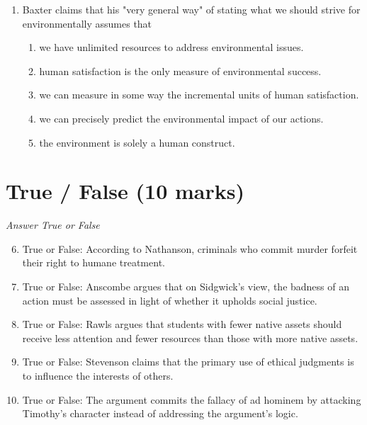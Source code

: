 \documentclass[12pt]{article}
\begin{document}
\begin{enumerate}[label=\arabic*.]
\begin{enumerate}[label=(\alph*)]
    \item Thomas Aquinas
    \item Catherine of Siena
    \item Teresa of Avila
    \item Hildegard of Bingen
    \item John of the Cross
\end{enumerate}
\item Baxter claims that his "very general way" of stating what we should strive for environmentally assumes that
\begin{enumerate}[label=(\alph*)]
    \item we have unlimited resources to address environmental issues.
    \item human satisfaction is the only measure of environmental success.
    \item we can measure in some way the incremental units of human satisfaction.
    \item we can precisely predict the environmental impact of our actions.
    \item the environment is solely a human construct.
\end{enumerate}
\end{enumerate}

\section*{True / False (10 marks)}
\textit{Answer True or False}
\begin{enumerate}[label=\arabic*.]
\setcounter{enumi}{5}
\item True or False: According to Nathanson, criminals who commit murder forfeit their right to humane treatment.
\item True or False: Anscombe argues that on Sidgwick's view, the badness of an action must be assessed in light of whether it upholds social justice.
\item True or False: Rawls argues that students with fewer native assets should receive less attention and fewer resources than those with more native assets.
\item True or False: Stevenson claims that the primary use of ethical judgments is to influence the interests of others.
\item True or False: The argument commits the fallacy of ad hominem by attacking Timothy's character instead of addressing the argument's logic.
\end{enumerate}
\end{document}
